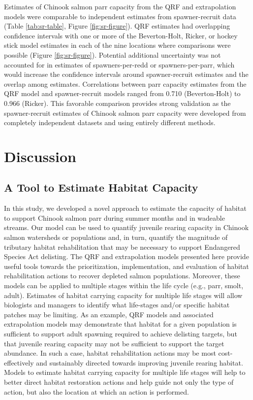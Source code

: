 \documentclass[
  12pt,
]{article}
\begin{document}
Estimates of Chinook salmon parr capacity from the QRF and extrapolation models were comparable to independent estimates from spawner-recruit data (Table \ref{tab:sr-table}, Figure \ref{fig:sr-figure}). QRF estimates had overlapping confidence intervals with one or more of the Beverton-Holt, Ricker, or hockey stick model estimates in each of the nine locations where comparisons were possible (Figure \ref{fig:sr-figure}). Potential additional uncertainty was not accounted for in estimates of spawners-per-redd or spawners-per-parr, which would increase the confidence intervals around spawner-recruit estimates and the overlap among estimates. Correlations between parr capacity estimates from the QRF model and spawner-recruit models ranged from 0.710 (Beverton-Holt) to 0.966 (Ricker). This favorable comparison provides strong validation as the spawner-recruit estimates of Chinook salmon parr capacity were developed from completely independent datasets and using entirely different methods.

\hypertarget{discussion}{%
\section{Discussion}\label{discussion}}

\hypertarget{a-tool-to-estimate-habitat-capacity}{%
\subsection{A Tool to Estimate Habitat Capacity}\label{a-tool-to-estimate-habitat-capacity}}

In this study, we developed a novel approach to estimate the capacity of habitat to support Chinook salmon parr during summer months and in wadeable streams. Our model can be used to quantify juvenile rearing capacity in Chinook salmon watersheds or populations and, in turn, quantify the magnitude of tributary habitat rehabilitation that may be necessary to support Endangered Species Act delisting. The QRF and extrapolation models presented here provide useful tools towards the prioritization, implementation, and evaluation of habitat rehabilitation actions to recover depleted salmon populations. Moreover, these models can be applied to multiple stages within the life cycle (e.g., parr, smolt, adult). Estimates of habitat carrying capacity for multiple life stages will allow biologists and managers to identify what life-stages and/or specific habitat patches may be limiting. As an example, QRF models and associated extrapolation models may demonstrate that habitat for a given population is sufficient to support adult spawning required to achieve delisting targets, but that juvenile rearing capacity may not be sufficient to support the target abundance. In such a case, habitat rehabilitation actions may be most cost-effectively and sustainably directed towards improving juvenile rearing habitat. Models to estimate habitat carrying capacity for multiple life stages will help to better direct habitat restoration actions and help guide not only the type of action, but also the location at which an action is performed.
\end{document}
